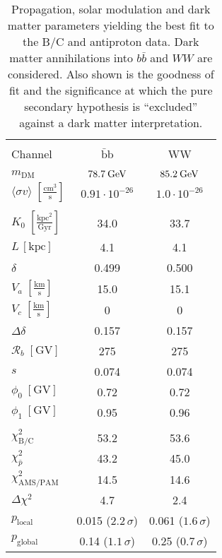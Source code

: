 \documentclass[a4paper,11pt]{article}
\newcommand{\eVdist}{\kern-0.06em}
\newcommand{\gev}{\:\text{Ge\eVdist V}}
\begin{document}
\begin{table}[htp]
\begin{center}
\begin{tabular}{|l|cc|}
\hline
\rowcolor{light-gray}   &&\\[-3mm]
\rowcolor{light-gray} Channel  & $\bar{\text{b}}$b & WW \\[2mm]
\hline
&&\\[-3mm]
 $m_{\text{DM}}$  & $78.7\gev$ & $85.2\gev$ \\[2mm]
$\langle \sigma v \rangle\;[\frac{\text{cm}^3}{\text{s}}]$  & $0.91\cdot 10^{-26}$ & $1.0\cdot 10^{-26}$  \\[2mm]
\hline
&&\\[-3mm]
$K_0\;[\frac{\text{kpc}^2}{\text{Gyr}}]$  & 34.0 & 33.7\\[2mm]
$L\,[\text{kpc}]$  & 4.1 & 4.1\\[2mm]
$\delta$ & 0.499 & 0.500\\[2mm]
$V_a\;[\frac{\text{km}}{\text{s}}]$ & 15.0 & 15.1 \\[2mm]
$V_c\;[\frac{\text{km}}{\text{s}}]$ & 0 & 0 \\[2mm]
$\Delta\delta$ & 0.157 & 0.157 \\[2mm]
$\mathcal{R}_b\;[\text{GV}]$&  275 & 275\\[2mm]
$s$ & 0.074 & 0.074 \\[2mm]
$\phi_0\;[\text{GV}]$ & 0.72 & 0.72 \\[2mm]
$\phi_1\;[\text{GV}]$ &  0.95 & 0.96 \\[2mm]
\hline
&&\\[-3mm]
$\chi^2_{\text{B/C}}$& 53.2 & 53.6\\[2mm]
$\chi^2_{\bar{p}}$ & 43.2  & 45.0  \\[2mm]
$\chi^2_{\text{AMS/PAM}}\;\;$ & 14.5  & 14.6 \\[2mm]
$\Delta\chi^2$ & 4.7  & 2.4 \\[2mm]
$p_\text{local}$ & 0.015 ($2.2\,\sigma$)& 0.061 ($1.6\,\sigma$)\\[2mm]
$p_\text{global}$ & 0.14 ($1.1\,\sigma$)& 0.25 ($0.7\,\sigma$)\\[2mm]
\hline
\end{tabular}
\end{center}
\caption{Propagation, solar modulation and dark matter parameters yielding the best fit to the B/C and antiproton data. Dark matter annihilations into $b\bar{b}$ and $WW$ are considered. Also shown is the goodness of fit and the significance at which the pure secondary hypothesis is ``excluded'' against a dark matter interpretation.} 
\label{tab:fitdm}
\end{table}
\end{document}
